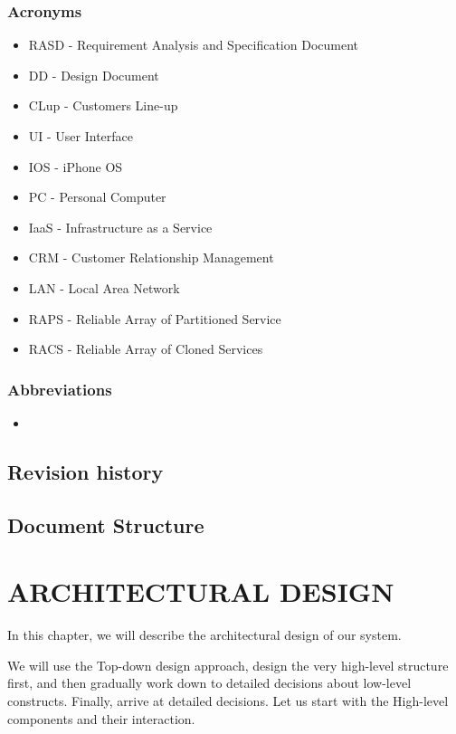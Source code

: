 \documentclass[a4paper,12pt]{report}
\begin{document}
\subsection{Acronyms}
\begin{itemize}
	\item RASD - Requirement Analysis and Specification Document
	\item DD - Design Document
	\item CLup - Customers Line-up
	\item UI - User Interface
	\item IOS - iPhone OS
	\item PC - Personal Computer
	\item IaaS - Infrastructure as a Service %
	\item CRM - Customer Relationship Management
	\item LAN - Local Area Network
	\item RAPS - Reliable Array of Partitioned Service
	\item RACS - Reliable Array of Cloned Services
\end{itemize}


\subsection{Abbreviations}
\begin{itemize}
	\item %
\end{itemize}


\section{Revision history}


\section{Document Structure}


\chapter{ARCHITECTURAL DESIGN}\label{ch:architectural-design}

In this chapter, we will describe the architectural design of our system.

We will use the Top-down design approach, design the very high-level structure first,
and then gradually work down to detailed decisions about low-level constructs.
Finally, arrive at detailed decisions.\cite{Slides}
Let us start with the High-level components and their interaction.
\end{document}
